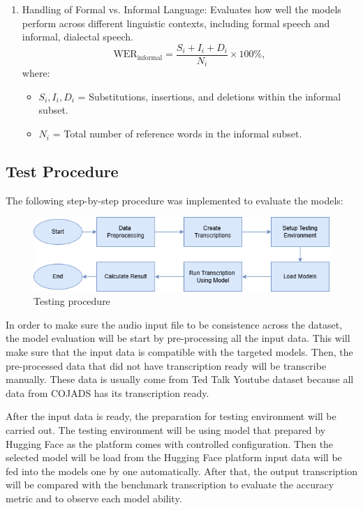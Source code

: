 \begin{enumerate}
    \item Handling of Formal vs. Informal Language: Evaluates how well the models perform across different linguistic contexts, including formal speech and informal, dialectal speech.
    \[
    \text{WER}_{\text{informal}} = \frac{S_i + I_i + D_i}{N_i} \times 100\%,
    \]
    where:
    \begin{itemize}
        \item \(S_i, I_i, D_i\) = Substitutions, insertions, and deletions within the informal subset.
        \item \(N_i\) = Total number of reference words in the informal subset.
    \end{itemize}
\end{enumerate}

\subsection{Test Procedure}
The following step-by-step procedure was implemented to evaluate the models:

\begin{figure}[!ht]
    \centering
    \includegraphics[width=1\textwidth]{mainmatter//images/step.png}
    \caption{Testing procedure }
\end{figure}

In order to make sure the audio input file to be consistence across the dataset, the model evaluation will be start by pre-processing all the input data. This will make sure that the input data is compatible with the targeted models. Then, the pre-processed data that did not have transcription ready will be transcribe manually. These data is usually come from Ted Talk Youtube dataset because all data from COJADS has its transcription ready.

After the input data is ready, the preparation for testing environment will be carried out. The testing environment will be using model that prepared by Hugging Face as the platform comes with controlled configuration. Then the selected model will be load from the Hugging Face platform input data will be fed into the models one by one automatically. After that, the output transcription will be compared with the benchmark transcription to evaluate the accuracy metric and to observe each model ability. 

